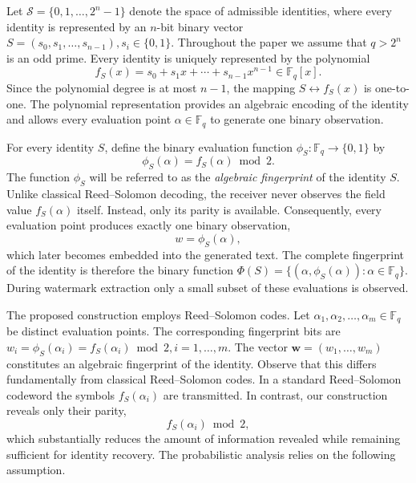 \documentclass[a4paper,11pt]{llncs}
\newtheorem{assumption}{Assumption}
\begin{document}
Let
$
\mathcal{S}
=
\{0,1,\ldots,2^n-1\}
$
denote the space of admissible identities, where every identity is
represented by an $n$-bit binary vector
$
S=(s_0,s_1,\ldots,s_{n-1}),
s_i\in\{0,1\}.
$
Throughout the paper we assume that
$q>2^n$
is an odd prime. Every identity is uniquely represented by the polynomial
\[
f_S(x)
=
s_0+s_1x+\cdots+s_{n-1}x^{n-1}
\in
\mathbb F_q[x].
\]
Since the polynomial degree is at most $n-1$, the mapping
$S
\longleftrightarrow
f_S(x)
$
is one-to-one.
The polynomial representation provides an algebraic encoding of the
identity and allows every evaluation point
$\alpha\in\mathbb F_q$
to generate one binary observation.

For every identity $S$, define the binary evaluation function
$
\phi_S:
\mathbb F_q
\longrightarrow
\{0,1\}
$
by
\[
\phi_S(\alpha)
=
f_S(\alpha)\bmod2.
\]
The function $\phi_S$ will be referred to as the
\emph{algebraic fingerprint} of the identity $S$.
Unlike classical Reed--Solomon decoding, the receiver never observes the
field value $f_S(\alpha)$ itself. Instead, only its parity is available.
Consequently, every evaluation point produces exactly one binary
observation,
\[
w=\phi_S(\alpha),
\]
which later becomes embedded into the generated text.
The complete fingerprint of the identity is therefore the binary function
$
\Phi(S)
=
\{
(\alpha,\phi_S(\alpha))
:
\alpha\in\mathbb F_q
\}.
$
During watermark extraction only a small subset of these evaluations is
observed.

The proposed construction employs
Reed--Solomon codes. Let
$
\alpha_1,\alpha_2,\ldots,\alpha_m
\in
\mathbb F_q
$
be distinct evaluation points.
The corresponding fingerprint bits are
$
w_i
=
\phi_S(\alpha_i)
=
f_S(\alpha_i)\bmod2,
i=1,\ldots,m.
$
The vector
$
\mathbf w
=
(w_1,\ldots,w_m)
$
constitutes an algebraic fingerprint of the identity.
Observe that this differs fundamentally from classical Reed--Solomon
codes. In a standard Reed--Solomon codeword the symbols
$f_S(\alpha_i)$
are transmitted.
In contrast, our construction reveals only their parity,
\[
f_S(\alpha_i)\bmod2,
\]
which substantially reduces the amount of information revealed while
remaining sufficient for identity recovery.
%
The probabilistic analysis relies on the following assumption.
\vspace{3mm}

\end{document}
